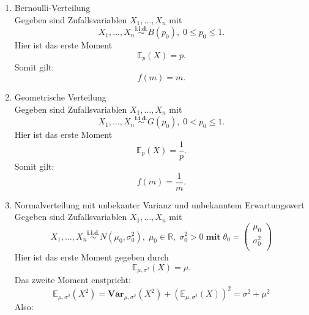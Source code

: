 \documentclass[10pt]{article}
\newcommand{\FZV}{X_1, \ldots, X_n} %
\newcommand{\IR}{\mathbb{R}} %
\newcommand{\EW}{\mathbb{E}} %
\newenvironment{BSP}[1][]
{\begin{Beispiel}[frametitle=#1]}{\end{Beispiel}}
\begin{document}
	\begin{BSP}[Beispiel 1.3.1 (Momentenmethoden-Schätzer)]
		\begin{enumerate}[label = (\roman*)]
			\item Bernoulli-Verteilung \\
			Gegeben sind Zufallsvariablen $\FZV$ mit
			\begin{equation*}
				\FZV \overset{\textbf{i.i.d.}}{\sim} B(p_0), \; 0 \leq p_0 \leq 1.
			\end{equation*} 
			Hier ist das erste Moment
			\begin{equation*}
				\EW_p(X)=p.
			\end{equation*}
			Somit gilt:
			\begin{equation*}
				f(m)=m.
			\end{equation*}
			
			\item Geometrische Verteilung \\
			Gegeben sind Zufallsvariablen $\FZV$ mit
			\begin{equation*}
				\FZV \overset{\textbf{i.i.d.}}{\sim} G(p_0), \; 0 < p_0 \leq 1.
			\end{equation*} 
			Hier ist das erste Moment
			\begin{equation*}
				\EW_p(X) = \frac{1}{p}.
			\end{equation*}
			Somit gilt:
			\begin{equation*}
				f(m)=\frac{1}{m}.
			\end{equation*}
			
			
			\item Normalverteilung mit unbekanter Varianz und unbekanntem Erwartungswert\\
			Gegeben sind Zufallsvariablen $\FZV$ mit
			\begin{equation*}
				\FZV \overset{\textbf{i.i.d.}} {\sim} N(\mu_0,\sigma_0^2),\; \mu_0 \in \IR, \; \sigma_0^2 >0 \; \textbf{mit} \; \theta_0 = \left(
				\begin{array}{c}
					\mu_0\\
					\sigma_0^2\\
				\end{array}
				\right)
			\end{equation*} 
			Hier ist das erste Moment gegeben durch
			\begin{equation*}
				\EW_{\mu,\sigma^2}(X)=\mu.
			\end{equation*}
			Das zweite Moment enstpricht: 
			\begin{equation*}
				\EW_{\mu,\sigma^2}(X^2)=\textbf{Var}_{\mu,\sigma^2}(X^2) + (\EW_{\mu,\sigma^2}(X))^2 = \sigma^2 + \mu^2
			\end{equation*}
			Also:
			

\end{enumerate}
\end{BSP}
\end{document}
